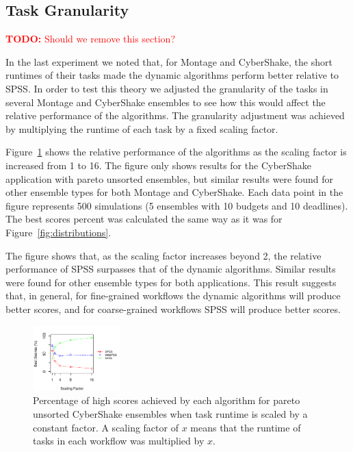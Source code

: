 \documentclass[conference]{IEEEtran}
\newcommand{\TODO}[1]{
  {\Large \textcolor{red}{\textbf{TODO: }#1}}
}
\begin{document}
\subsection{Task Granularity}
\TODO{Should we remove this section?}

In the last experiment we noted that, for Montage and CyberShake, the short
runtimes of their tasks made the dynamic algorithms perform better relative to
SPSS. In order to test this theory we adjusted the granularity of the tasks in
several Montage and CyberShake ensembles to see how this would affect the
relative performance of the algorithms. The granularity adjustment was
achieved by multiplying the runtime of each task by a fixed scaling factor.

Figure~\ref{fig:stretching} shows the relative performance of the algorithms
as the scaling factor is increased from 1 to 16. The figure only shows results
for the CyberShake application with pareto unsorted ensembles, but similar
results were found for other ensemble types for both Montage and CyberShake.
Each data point in the figure represents 500 simulations (5 ensembles with 10
budgets and 10 deadlines). The best scores percent was calculated the same way
as it was for Figure~\ref{fig:distributions}.

The figure shows that, as the scaling factor increases beyond 2, the relative
performance of SPSS surpasses that of the dynamic algorithms. Similar results
were found for other ensemble types for both applications. This result
suggests that, in general, for fine-grained workflows the dynamic algorithms
will produce better scores, and for coarse-grained workflows SPSS will produce
better scores.

\begin{figure}[tb]
    \centering
    \includegraphics[width=0.3\textwidth]{stretching_cybershake}
    \caption{Percentage of high scores achieved by each algorithm for pareto 
    unsorted CyberShake ensembles when task runtime is scaled by a constant 
    factor. A scaling factor of $x$ means that the runtime of tasks in each 
    workflow was multiplied by $x$.}
    \label{fig:stretching}
\end{figure}
\end{document}
